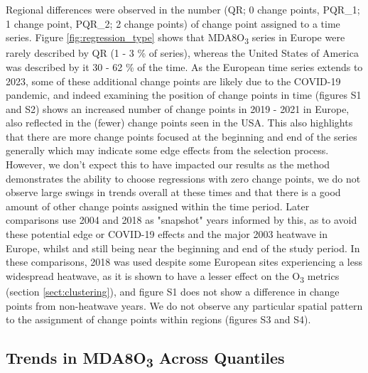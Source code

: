 \documentclass[journal abbreviation, manuscript]{copernicus}
\begin{document}
Regional differences were observed in the number (QR; 0 change points, PQR\_1; 1 change point, PQR\_2; 2 change points) of change point assigned to a time series. Figure \ref{fig:regression_type} shows that MDA8O\textsubscript{3} series in Europe were rarely described by QR (1 - 3 \% of series), whereas the United States of America was described by it 30 - 62 \% of the time. As the European time series extends to 2023, some of these additional change points are likely due to the COVID-19 pandemic, and indeed examining the position of change points in time (figures S1 and S2) shows an increased number of change points in 2019 - 2021 in Europe, also reflected in the (fewer) change points seen in the USA. This also highlights that there are more change points focused at the beginning and end of the series generally which may indicate some edge effects from the selection process. However, we don't expect this to have impacted our results as the method demonstrates the ability to choose regressions with zero change points, we do not observe large swings in trends overall at these times and that there is a good amount of other change points assigned within the time period. Later comparisons use 2004 and 2018 as "snapshot" years informed by this, as to avoid these potential edge or COVID-19 effects and the major 2003 heatwave in Europe, whilst and still being near the beginning and end of the study period. In these comparisons, 2018 was used despite some European sites experiencing a less widespread heatwave, as it is shown to have a lesser effect on the O\textsubscript{3} metrics (section \ref{sect:clustering}), and figure S1 does not show a difference in change points from non-heatwave years. We do not observe any particular spatial pattern to the assignment of change points within regions (figures S3 and S4).
 

\subsection{Trends in MDA8O\textsubscript{3} Across Quantiles} \label{sect:new_mda8_trends}
\end{document}
